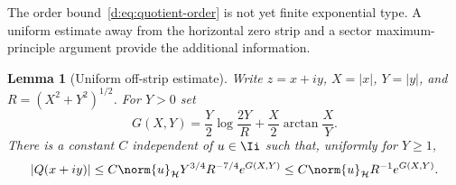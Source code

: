 \documentclass[11pt,a4paper]{article}
\numberwithin{equation}{section}
\newtheorem{lemma}[theorem]{Lemma}
\theoremstyle{definition}\newtheorem{definition}[theorem]{Definition}
\theoremstyle{remark}\newtheorem{remark}[theorem]{Remark}
\newcommand{\Hh}{\mathcal H}\newcommand{\Hw}{\mathcal H}
\begin{document}
The order bound~\eqref{d:eq:quotient-order} is not yet finite exponential type. A uniform estimate away from the horizontal zero strip and a sector maximum-principle argument provide the additional information.

\begin{lemma}[Uniform off-strip estimate]\label{d:lem:offstrip}
Write $z=x+iy$, $X=|x|$, $Y=|y|$, and $R=(X^2+Y^2)^{1/2}$. For $Y>0$ set
\begin{equation}\label{d:eq:G-function}
 G(X,Y)=\frac Y2\log\frac{2Y}{R}+\frac X2\arctan\frac XY.
\end{equation}
There is a constant $C$ independent of $u\in\Ii$ such that, uniformly for $Y\ge1$,
\begin{equation}\label{d:eq:offstrip}
 |Q(x+iy)|\le C\norm{u}_{\Hh}Y^{3/4}R^{-7/4}e^{G(X,Y)}
 \le C\norm{u}_{\Hh}R^{-1}e^{G(X,Y)}.
\end{equation}
\end{lemma}
\end{document}
